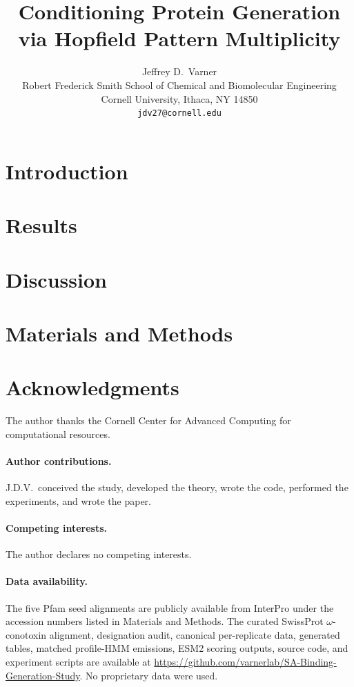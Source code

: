 \documentclass{article}
\title{Conditioning Protein Generation via Hopfield Pattern Multiplicity}
\author{%
  Jeffrey D.~Varner \\
  Robert Frederick Smith School of Chemical and Biomolecular Engineering\\
  Cornell University, Ithaca, NY 14850 \\
  \texttt{jdv27@cornell.edu} \\
}
\theoremstyle{definition}
\theoremstyle{remark}
\begin{document}
\maketitle

\begin{abstract}

\end{abstract}


\section{Introduction}


\section{Results}


\section{Discussion}


\section{Materials and Methods}



\section*{Acknowledgments}
The author thanks the Cornell Center for Advanced Computing for computational resources.

\paragraph{Author contributions.}
J.D.V.\ conceived the study, developed the theory, wrote the code, performed the experiments, and wrote the paper.

\paragraph{Competing interests.}
The author declares no competing interests.

\paragraph{Data availability.}
The five Pfam seed alignments are publicly available from InterPro under the accession numbers
listed in Materials and Methods. The curated SwissProt $\omega$-conotoxin alignment,
designation audit, canonical per-replicate data, generated tables, matched profile-HMM
emissions, ESM2 scoring outputs, source code, and experiment scripts are available at
\url{https://github.com/varnerlab/SA-Binding-Generation-Study}. No proprietary data were used.
\end{document}
